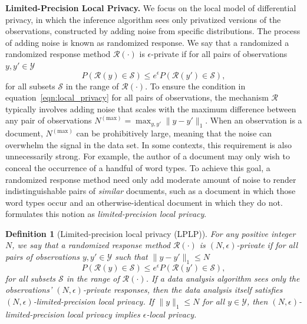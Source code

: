 \documentclass{article}
\newtheorem{definition}{Definition}
\newcommand{\tm}{\!-\!}
\begin{document}

\textbf{Limited-Precision Local Privacy.}  We focus on the local model
of differential privacy, in which the inference algorithm sees only
privatized versions of the observations, constructed by adding noise
from specific distributions. The process of adding noise is known as
randomized response. We say that a randomized
a randomized response method $\mathcal{R}(\cdot)$ is $\epsilon$-private if for all pairs of observations $y, y' \in \mathcal{Y}$
\begin{equation}
  \label{eqn:local_privacy}
    P\left(\mathcal{R}(y) \in \mathcal{S}\right) \leq e^\epsilon
      P\left(\mathcal{R}(y') \in \mathcal{S}\right),
\end{equation}
for all subsets $\mathcal{S}$ in the range of $\mathcal{R}(\cdot)$. To
ensure the condition in equation~\ref{eqn:local_privacy} for all pairs
of observations, the mechanism $\mathcal{R}$ typically involves adding
noise that scales with the maximum difference between any pair of
observations $N^{(\textrm{max})} = \max_{y, y'}\|y \tm y'\|_1$. When
an observation is a document, $N^{(\textrm{max})}$ can be
prohibitively large, meaning that the noise can overwhelm the signal
in the data set. In some contexts, this requirement is also
unnecessarily strong. For example, the author of a document may only
wish to conceal the occurrence of a handful of word types. To achieve
this goal, a randomized response method need only add moderate amount
of noise to render indistinguishable pairs of \emph{similar}
documents, such as a document in which those word types occur and an
otherwise-identical document in which they do
not. \cite{schein2018locally} formulates this notion as
\emph{limited-precision local privacy}.


\begin{definition}[Limited-precision local privacy (LPLP)]
\label{def:lplp}
For any positive integer $N$, we say that a randomized response method
$\mathcal{R}(\cdot)$ is $(N, \epsilon)$-private if for all pairs of
observations $y, y' \in \mathcal{Y}$ such that $\|y - y'\|_1 \leq N$
\begin{equation}
  \label{eqn:lp_local_privacy}
    P\left(\mathcal{R}(y) \in \mathcal{S}\right) \leq e^\epsilon
      P\left(\mathcal{R}(y') \in \mathcal{S}\right),
        \end{equation}
for all subsets $\mathcal{S}$ in the range of $\mathcal{R}(\cdot)$.
If a data analysis algorithm sees only the observations' $(N,
\epsilon)$-private responses, then the data analysis itself satisfies
$(N, \epsilon)$-limited-precision local privacy. If $\|y\|_1 \leq N$
for all $y \in \mathcal{Y}$, then $(N, \epsilon)$-limited-precision
local privacy implies $\epsilon$-local privacy.
\end{definition}
\end{document}
